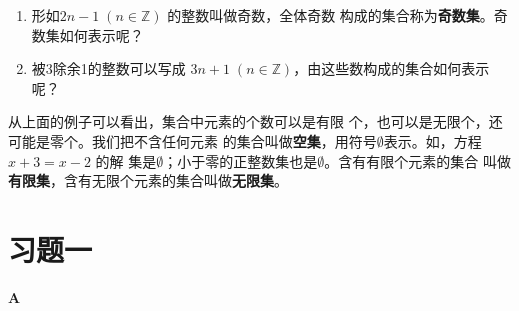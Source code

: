 \begin{blk}
\begin{enumerate}
    \item 形如$2n-1\; (n\in\mathbb{Z})$
    的整数叫做奇数，全体奇数
    构成的集合称为\textbf{奇数集}。奇数集如何表示呢？
    \item 被3除余1的整数可以写成
    $3n+1\; (n\in\mathbb{Z})$，由这些数构成的集合如何表示呢？
\end{enumerate}
\end{blk}

从上面的例子可以看出，集合中元素的个数可以是有限
个，也可以是无限个，还可能是零个。我们把不含任何元素
的集合叫做\textbf{空集}，用符号$\emptyset$表示。如，方程
$x+3=x-2$
的解
集是$\emptyset$；小于零的正整数集也是$\emptyset$。含有有限个元素的集合
叫做\textbf{有限集}，含有无限个元素的集合叫做\textbf{无限集}。

\section*{习题一}
\begin{center}
  \bfseries  A
\end{center}

